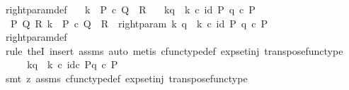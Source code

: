 \begin{isabellebody}
\isanewline
{}\isamarkupfalse%
\ right{\isacharunderscore}{\kern0pt}param{\isacharunderscore}{\kern0pt}def{}{\isacharcolon}{\kern0pt}\isanewline
\ \ \ {\isachardoublequoteopen}k\ {\isacharcolon}{\kern0pt}\ P\ {\isasymtimes}\isactrlsub c\ Q\ {\isasymrightarrow}\ R{\isachardoublequoteclose}\isanewline
\ \ \ {\isachardoublequoteopen}k\isactrlbsub {\isacharbrackleft}{\kern0pt}{\isacharminus}{\kern0pt}{\isacharcomma}{\kern0pt}q{\isacharbrackright}{\kern0pt}\isactrlesub \ {\isasymequiv}\ k\ {\isasymcirc}\isactrlsub c\ {\isasymlangle}id\ P{\isacharcomma}{\kern0pt}\ q\ {\isasymcirc}\isactrlsub c\ {\isasymbeta}\isactrlbsub P\isactrlesub {\isasymrangle}{\isachardoublequoteclose}\isanewline
%
\isadelimproof
%
\endisadelimproof
%
\isatagproof
{}\isamarkupfalse%
\ {\isacharminus}{\kern0pt}\ \isanewline
\ \ \isamarkupfalse%
\ {\isachardoublequoteopen}{\isasymexists}\ P\ Q\ R{\isachardot}{\kern0pt}\ k\ {\isacharcolon}{\kern0pt}\ P\ {\isasymtimes}\isactrlsub c\ Q\ {\isasymrightarrow}\ R\ {\isasymand}\ right{\isacharunderscore}{\kern0pt}param\ k\ q\ {\isacharequal}{\kern0pt}\ k\ {\isasymcirc}\isactrlsub c\ {\isasymlangle}id\ P{\isacharcomma}{\kern0pt}\ q\ {\isasymcirc}\isactrlsub c\ {\isasymbeta}\isactrlbsub P\isactrlesub {\isasymrangle}{\isachardoublequoteclose}\isanewline
\ \ \ \ \isamarkupfalse%
\ right{\isacharunderscore}{\kern0pt}param{\isacharunderscore}{\kern0pt}def\ \isamarkupfalse%
\ {\isacharparenleft}{\kern0pt}rule\ theI{\isacharprime}{\kern0pt}{\isacharcomma}{\kern0pt}\ insert\ assms{\isacharcomma}{\kern0pt}\ auto{\isacharcomma}{\kern0pt}\ metis\ cfunc{\isacharunderscore}{\kern0pt}type{\isacharunderscore}{\kern0pt}def\ exp{\isacharunderscore}{\kern0pt}set{\isacharunderscore}{\kern0pt}inj\ transpose{\isacharunderscore}{\kern0pt}func{\isacharunderscore}{\kern0pt}type{\isacharparenright}{\kern0pt}\ \isanewline
\ \ \isamarkupfalse%
\ \isamarkupfalse%
\ {\isachardoublequoteopen}k\isactrlbsub {\isacharbrackleft}{\kern0pt}{\isacharminus}{\kern0pt}{\isacharcomma}{\kern0pt}q{\isacharbrackright}{\kern0pt}\isactrlesub \ {\isasymequiv}\ k\ {\isasymcirc}\isactrlsub c\ {\isasymlangle}id\isactrlsub c\ P{\isacharcomma}{\kern0pt}q\ {\isasymcirc}\isactrlsub c\ {\isasymbeta}\isactrlbsub P\isactrlesub {\isasymrangle}{\isachardoublequoteclose}\isanewline
\ \ \ \ \isamarkupfalse%
\ {\isacharparenleft}{\kern0pt}smt\ {\isacharparenleft}{\kern0pt}z{}{\isacharparenright}{\kern0pt}\ assms\ cfunc{\isacharunderscore}{\kern0pt}type{\isacharunderscore}{\kern0pt}def\ exp{\isacharunderscore}{\kern0pt}set{\isacharunderscore}{\kern0pt}inj\ transpose{\isacharunderscore}{\kern0pt}func{\isacharunderscore}{\kern0pt}type{\isacharparenright}{\kern0pt}\isanewline

\end{isabellebody}
